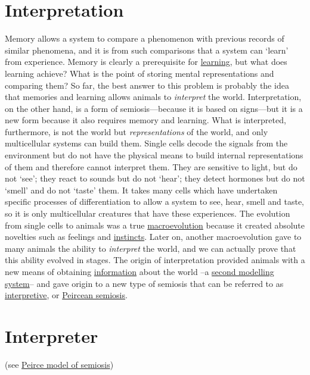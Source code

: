 \documentclass[12pt]{article}
\begin{document}
\section{Interpretation}
Memory allows a system to compare a phenomenon with previous records of similar phenomena, and it is from such comparisons that a system can `learn' from experience. Memory is clearly a prerequisite for \hyperlink{learning}{learning}, but what does learning achieve? What is the point of storing mental representations and comparing them? So far, the best answer to this problem is probably the idea that memories and learning allows animals to \textit{interpret} the world. Interpretation, on the other hand, is a form of semiosis---because it is based on signs---but it is a new form because it also requires memory and learning. What is interpreted, furthermore, is not the world but \textit{representations} of the world, and only multicellular systems can build them. Single cells decode the signals from the environment but do not have the physical means to build internal representations of them and therefore cannot interpret them. They are sensitive to light, but do not `see'; they react to sounds but do not `hear'; they detect hormones but do not `smell' and do not `taste' them. It takes many cells which have undertaken specific processes of differentiation to allow a system to see, hear, smell and taste, so it is only multicellular creatures that have these experiences. The evolution from single cells to animals was a true \hyperlink{macroevolution}{macroevolution} because it created absolute novelties such as feelings and \hyperlink{instinctive_brain}{instincts}. Later on, another macroevolution gave to many animals the ability to \textit{interpret} the world, and we can actually prove that this ability evolved in stages. The origin of interpretation provided animals with a new means of obtaining \hyperlink{information}{information} about the world --a \hyperlink{brains_second_modelling_system}{second modelling system}-- and gave origin to a new type of semiosis that can be referred to as \hyperlink{interpretive_semiosis}{interpretive}, or \hyperlink{peirce_model_of_semiosis}{Peircean semiosis}. 


\hypertarget{interpreter}{}
\section{Interpreter} 

(see \hyperlink{peirce_model_of_semiosis}{Peirce model of semiosis})
\end{document}
